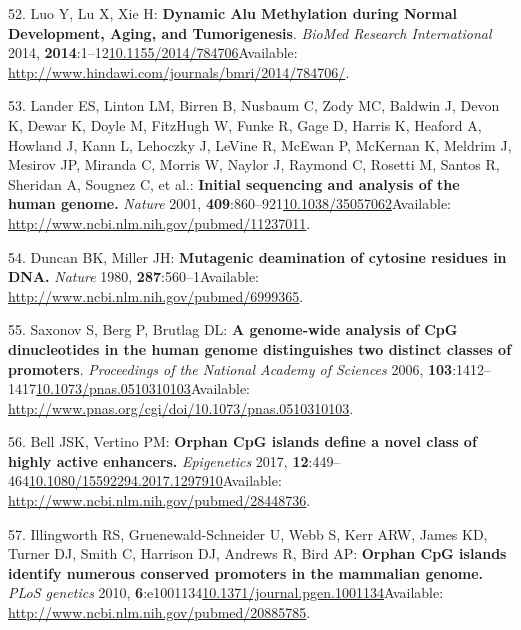 \documentclass[
]{book}
\begin{document}
\leavevmode\hypertarget{ref-Luo2014}{}%
52. Luo Y, Lu X, Xie H: \textbf{Dynamic Alu Methylation during Normal Development, Aging, and Tumorigenesis}. \emph{BioMed Research International} 2014, \textbf{2014}:1--12\href{https://doi.org/10.1155/2014/784706}{10.1155/2014/784706}Available: \url{http://www.hindawi.com/journals/bmri/2014/784706/}.

\leavevmode\hypertarget{ref-Lander2001}{}%
53. Lander ES, Linton LM, Birren B, Nusbaum C, Zody MC, Baldwin J, Devon K, Dewar K, Doyle M, FitzHugh W, Funke R, Gage D, Harris K, Heaford A, Howland J, Kann L, Lehoczky J, LeVine R, McEwan P, McKernan K, Meldrim J, Mesirov JP, Miranda C, Morris W, Naylor J, Raymond C, Rosetti M, Santos R, Sheridan A, Sougnez C, et al.: \textbf{Initial sequencing and analysis of the human genome.} \emph{Nature} 2001, \textbf{409}:860--921\href{https://doi.org/10.1038/35057062}{10.1038/35057062}Available: \url{http://www.ncbi.nlm.nih.gov/pubmed/11237011}.

\leavevmode\hypertarget{ref-Duncan1980}{}%
54. Duncan BK, Miller JH: \textbf{Mutagenic deamination of cytosine residues in DNA.} \emph{Nature} 1980, \textbf{287}:560--1Available: \url{http://www.ncbi.nlm.nih.gov/pubmed/6999365}.

\leavevmode\hypertarget{ref-Saxonov2006}{}%
55. Saxonov S, Berg P, Brutlag DL: \textbf{A genome-wide analysis of CpG dinucleotides in the human genome distinguishes two distinct classes of promoters}. \emph{Proceedings of the National Academy of Sciences} 2006, \textbf{103}:1412--1417\href{https://doi.org/10.1073/pnas.0510310103}{10.1073/pnas.0510310103}Available: \url{http://www.pnas.org/cgi/doi/10.1073/pnas.0510310103}.

\leavevmode\hypertarget{ref-Bell2017}{}%
56. Bell JSK, Vertino PM: \textbf{Orphan CpG islands define a novel class of highly active enhancers.} \emph{Epigenetics} 2017, \textbf{12}:449--464\href{https://doi.org/10.1080/15592294.2017.1297910}{10.1080/15592294.2017.1297910}Available: \url{http://www.ncbi.nlm.nih.gov/pubmed/28448736}.

\leavevmode\hypertarget{ref-Illingworth2010}{}%
57. Illingworth RS, Gruenewald-Schneider U, Webb S, Kerr ARW, James KD, Turner DJ, Smith C, Harrison DJ, Andrews R, Bird AP: \textbf{Orphan CpG islands identify numerous conserved promoters in the mammalian genome.} \emph{PLoS genetics} 2010, \textbf{6}:e1001134\href{https://doi.org/10.1371/journal.pgen.1001134}{10.1371/journal.pgen.1001134}Available: \url{http://www.ncbi.nlm.nih.gov/pubmed/20885785}.
\end{document}
